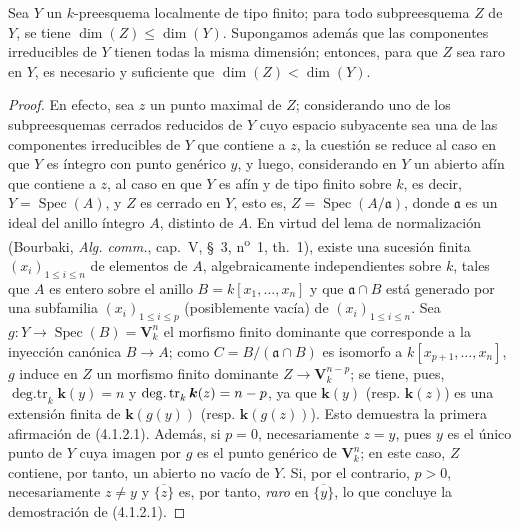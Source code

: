 \begin{corollary}[4.1.2.1]
\label{IV.2.4.1.2.1-fr}
Sea $Y$ un $k$-preesquema localmente de tipo finito; para todo subpreesquema
$Z$ de $Y$, se tiene $\dim(Z)\leqslant\dim(Y)$. Supongamos además que las
componentes irreducibles de $Y$ tienen todas la misma dimensión; entonces, para
que $Z$ sea raro en $Y$, es necesario y suficiente que
$\dim(Z)<\dim(Y)$.
\end{corollary}

\begin{proof}
En efecto, sea $z$ un punto maximal de $Z$; considerando uno de los
subpreesquemas cerrados reducidos de $Y$ cuyo espacio subyacente sea una de las
componentes irreducibles de $Y$ que contiene a $z$, la cuestión se reduce al caso en
que $Y$ es íntegro con punto genérico $y$, y luego, considerando en $Y$ un
abierto afín que contiene a $z$, al caso en que $Y$ es afín y de tipo finito
sobre $k$, es decir, $Y=\operatorname{Spec}(A)$, y $Z$ es cerrado en $Y$, esto
es, $Z=\operatorname{Spec}(A/\mathfrak a)$, donde $\mathfrak a$ es un ideal
del anillo íntegro $A$, distinto de $A$. En virtud del lema de normalización
(Bourbaki, \emph{Alg. comm.}, cap.~V, \S~3,
n\textsuperscript{o}~1, th.~1), existe una sucesión finita
$(x_i)_{1\leqslant i\leqslant n}$ de elementos de $A$, algebraicamente
independientes sobre $k$, tales que $A$ es entero sobre el anillo
$B=k[x_1,\ldots,x_n]$ y que $\mathfrak a\cap B$ está generado por una
subfamilia $(x_i)_{1\leqslant i\leqslant p}$ (posiblemente vacía) de
$(x_i)_{1\leqslant i\leqslant n}$. Sea
$g:Y\to\operatorname{Spec}(B)=\mathbf V_k^n$ el morfismo finito dominante que
corresponde a la inyección canónica $B\to A$; como
$C=B/(\mathfrak a\cap B)$ es isomorfo a $k[x_{p+1},\ldots,x_n]$, $g$ induce
en $Z$ un morfismo finito dominante $Z\to\mathbf V_k^{n-p}$; se tiene, pues,
$\operatorname{deg.tr}_k \boldsymbol{k}(y)=n$ y
$\operatorname{deg.tr}_k \boldsymbol{k}(z)=n- p$, ya que $\boldsymbol{k}(y)$ (resp. $\boldsymbol{k}(z)$) es una
extensión finita de $\boldsymbol{k}(g(y))$ (resp. $\boldsymbol{k}(g(z))$). Esto demuestra la primera
afirmación de (4.1.2.1). Además, si $p=0$, necesariamente $z=y$, pues $y$ es
el único punto de $Y$ cuya imagen por $g$ es el punto genérico de
$\mathbf V_k^n$; en este caso, $Z$ contiene, por tanto, un abierto no vacío de
$Y$. Si, por el contrario, $p>0$, necesariamente $z\neq y$ y
$\overline{\{z\}}$ es, por tanto, \emph{raro} en $\overline{\{y\}}$, lo que concluye
la demostración de (4.1.2.1).
\end{proof}

